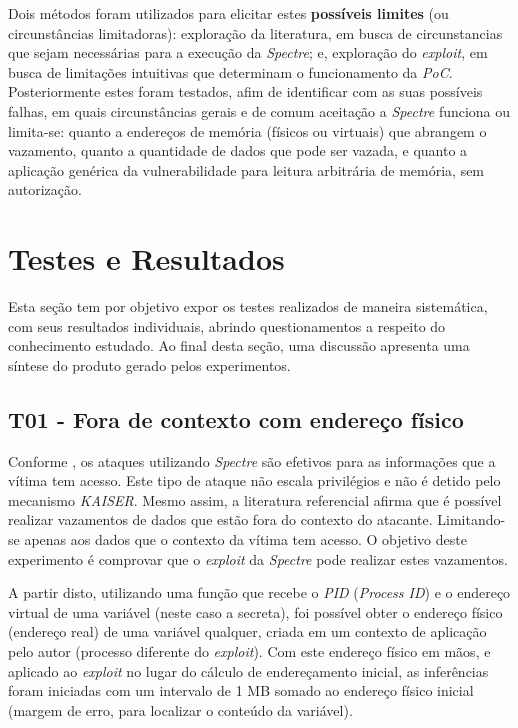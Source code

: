 \documentclass[
	article,			    %
	12pt,				    %
	oneside,			    %
	a4paper,			    %
	chapter=TITLE,		    %
	section=TITLE,		    %
	subsection=TITLE,	    %
	english,			    %
	brazil,				    %
	sumario=tradicional
]{abntex2}
\begin{document}
Dois métodos foram utilizados para elicitar estes \textbf{possíveis limites} (ou circunstâncias limitadoras): exploração da literatura, em busca de circunstancias que sejam necessárias para a execução da \emph{Spectre}; e, exploração do \emph{exploit}, em busca de limitações intuitivas que determinam o funcionamento da \emph{PoC}. Posteriormente estes foram testados, afim de identificar com as suas possíveis falhas, em quais circunstâncias gerais e de comum aceitação a \emph{Spectre} funciona ou limita-se: quanto a endereços de memória (físicos ou virtuais) que abrangem o vazamento, quanto a quantidade de dados que pode ser vazada, e quanto a aplicação genérica da vulnerabilidade para leitura arbitrária de memória, sem autorização.

\section{Testes e Resultados}
Esta seção tem por objetivo expor os testes realizados de maneira sistemática, com seus resultados individuais, abrindo questionamentos a respeito do conhecimento estudado. Ao final desta seção, uma discussão apresenta uma síntese do produto gerado pelos experimentos.
\subsection{T01 - Fora de contexto com endereço físico}
Conforme , os ataques utilizando \emph{Spectre} são efetivos para as informações que a vítima tem acesso. Este tipo de ataque não escala privilégios e não é detido pelo mecanismo \emph{KAISER}. Mesmo assim, a literatura referencial afirma que é possível realizar vazamentos de dados que estão fora do contexto do atacante. Limitando-se apenas aos dados que o contexto da vítima tem acesso. O objetivo deste experimento é comprovar que o \emph{exploit} da \emph{Spectre} pode realizar estes vazamentos.

A partir disto, utilizando uma função que recebe o \emph{PID} (\emph{Process ID}) e o endereço virtual de uma variável (neste caso a secreta), foi possível obter o endereço físico (endereço real) de uma variável qualquer, criada em um contexto de aplicação pelo autor (processo diferente do \emph{exploit}). Com este endereço físico em mãos, e aplicado ao \emph{exploit} no lugar do cálculo de endereçamento inicial, as inferências foram iniciadas com um intervalo de 1 MB somado ao endereço físico inicial (margem de erro, para localizar o conteúdo da variável).
\end{document}
